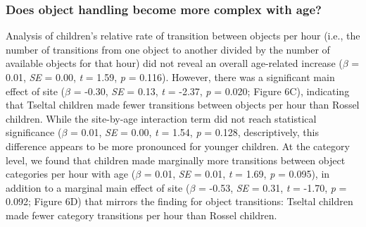 \documentclass[10pt, letterpaper]{article}
\begin{document}
\hypertarget{does-object-handling-become-more-complex-with-age}{%
\subsubsection{Does object handling become more complex with
age?}\label{does-object-handling-become-more-complex-with-age}}

Analysis of children's relative rate of transition between objects per
hour (i.e., the number of transitions from one object to another divided
by the number of available objects for that hour) did not reveal an
overall age-related increase (\(\beta\) = 0.01, \emph{SE} = 0.00,
\emph{t} = 1.59, \emph{p} = 0.116). However, there was a significant
main effect of site (\(\beta\) = -0.30, \emph{SE} = 0.13, \emph{t} =
-2.37, \emph{p} = 0.020; Figure 6C), indicating that Tseltal children
made fewer transitions between objects per hour than Rossel children.
While the site-by-age interaction term did not reach statistical
significance (\(\beta\) = 0.01, \emph{SE} = 0.00, \emph{t} = 1.54,
\emph{p} = 0.128, descriptively, this difference appears to be more
pronounced for younger children. At the category level, we found that
children made marginally more transitions between object categories per
hour with age (\(\beta\) = 0.01, \emph{SE} = 0.01, \emph{t} = 1.69,
\emph{p} = 0.095), in addition to a marginal main effect of site
(\(\beta\) = -0.53, \emph{SE} = 0.31, \emph{t} = -1.70, \emph{p} =
0.092; Figure 6D) that mirrors the finding for object transitions:
Tseltal children made fewer category transitions per hour than Rossel
children.
\end{document}
